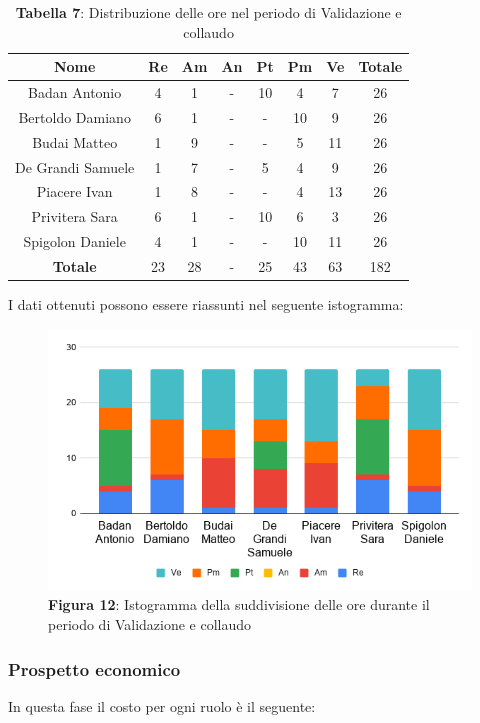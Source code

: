 \begin{table}[H]
	\centering
	\renewcommand{\arraystretch}{1.5}
	\begin{tabular}{|c|c|c|c|c|c|c|c|}
		\hline
		\rowcolor{lighter-grayer}
Nome & Re & Am & An & Pt & Pm & Ve & Totale \\ \hline
Badan Antonio & 4 & 1 & - & 10 & 4 & 7 & 26 \\ \hline
Bertoldo Damiano & 6 & 1 & - & - & 10 & 9 & 26 \\ \hline
Budai Matteo & 1 & 9 & - & - & 5 & 11 & 26 \\ \hline
De Grandi Samuele & 1 & 7 & - & 5 & 4 & 9 & 26 \\ \hline
Piacere Ivan & 1 & 8 & - & - & 4 & 13 & 26 \\ \hline
Privitera Sara & 6 & 1 & - & 10 & 6 & 3 & 26 \\ \hline
Spigolon Daniele & 4 & 1 & - & - & 10 & 11 & 26 \\ \hline
\textbf{Totale} & 23 & 28 & - & 25 & 43 & 63 & 182 \\ \hline
	\end{tabular}
	\caption*{\textbf{Tabella 7}: Distribuzione delle ore nel periodo di Validazione e collaudo\\}
\end{table}	
	I dati ottenuti possono essere riassunti nel seguente istogramma:

\begin{figure}[H]
	\centering
	\includegraphics[width=0.7\linewidth]{res/images/IstogrammaFase4.png}
	\caption*{\textbf{Figura 12}: Istogramma della suddivisione delle ore durante il periodo di Validazione e collaudo}
	\label{fig:Figura10}
\end{figure}
	
	
\subsubsection{Prospetto economico}
In questa fase il costo per ogni ruolo è il seguente:

